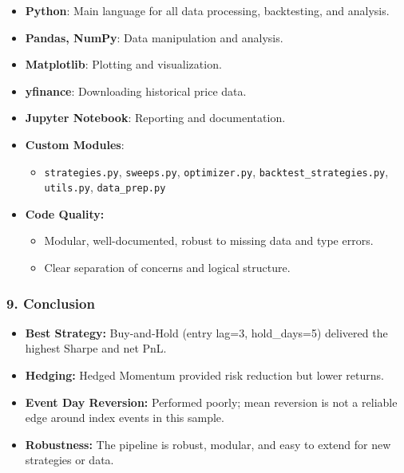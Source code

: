 \documentclass[11pt]{article}
\providecommand{\tightlist}{%
      \setlength{\itemsep}{0pt}\setlength{\parskip}{0pt}}
\begin{document}
\begin{itemize}
\tightlist
\item
  \textbf{Python}: Main language for all data processing, backtesting,
  and analysis.
\item
  \textbf{Pandas, NumPy}: Data manipulation and analysis.
\item
  \textbf{Matplotlib}: Plotting and visualization.
\item
  \textbf{yfinance}: Downloading historical price data.
\item
  \textbf{Jupyter Notebook}: Reporting and documentation.
\item
  \textbf{Custom Modules}:

  \begin{itemize}
  \tightlist
  \item
    \texttt{strategies.py}, \texttt{sweeps.py}, \texttt{optimizer.py},
    \texttt{backtest\_strategies.py}, \texttt{utils.py},
    \texttt{data\_prep.py}
  \end{itemize}
\item
  \textbf{Code Quality:}

  \begin{itemize}
  \tightlist
  \item
    Modular, well-documented, robust to missing data and type errors.
  \item
    Clear separation of concerns and logical structure.
  \end{itemize}
\end{itemize}

\subsubsection*{9. Conclusion}

\begin{itemize}
\tightlist
\item
  \textbf{Best Strategy:} Buy-and-Hold (entry lag=3, hold\_days=5)
  delivered the highest Sharpe and net PnL.
\item
  \textbf{Hedging:} Hedged Momentum provided risk reduction but lower
  returns.
\item
  \textbf{Event Day Reversion:} Performed poorly; mean reversion is not
  a reliable edge around index events in this sample.
\item
  \textbf{Robustness:} The pipeline is robust, modular, and easy to
  extend for new strategies or data.

\end{itemize}


    
    
    
\end{document}
